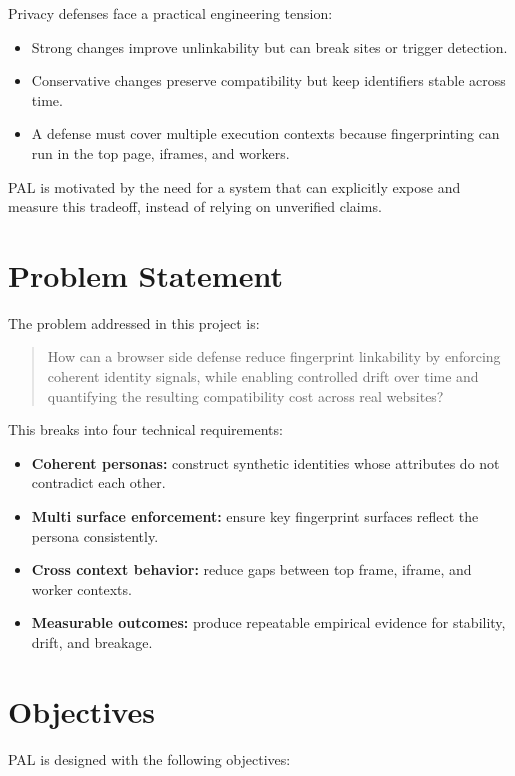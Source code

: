 \documentclass[11pt]{report}
\begin{document}
Privacy defenses face a practical engineering tension:

\begin{itemize}
    \item Strong changes improve unlinkability but can break sites or trigger detection.
    \item Conservative changes preserve compatibility but keep identifiers stable across time.
    \item A defense must cover multiple execution contexts because fingerprinting can run in the top page, iframes, and workers.
\end{itemize}

PAL is motivated by the need for a system that can explicitly expose and measure this tradeoff, instead of relying on unverified claims.

\section{Problem Statement}

The problem addressed in this project is:

\begin{quote}
How can a browser side defense reduce fingerprint linkability by enforcing coherent identity signals, while enabling controlled drift over time and quantifying the resulting compatibility cost across real websites?
\end{quote}

This breaks into four technical requirements:

\begin{itemize}
    \item \textbf{Coherent personas:} construct synthetic identities whose attributes do not contradict each other.
    \item \textbf{Multi surface enforcement:} ensure key fingerprint surfaces reflect the persona consistently.
    \item \textbf{Cross context behavior:} reduce gaps between top frame, iframe, and worker contexts.
    \item \textbf{Measurable outcomes:} produce repeatable empirical evidence for stability, drift, and breakage.
\end{itemize}

\section{Objectives}

PAL is designed with the following objectives:
\end{document}
